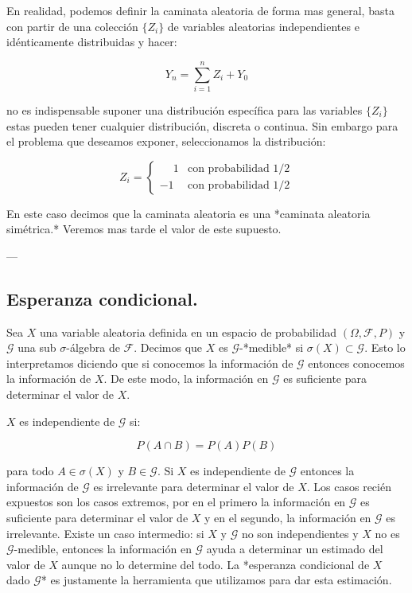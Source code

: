\documentclass{extreport}
\theoremstyle{definicion}
\theoremstyle{propiedad}
\begin{document}
En realidad, podemos definir la caminata aleatoria de forma mas general, basta con partir de una colección $\{Z_i\}$ de variables aleatorias independientes e idénticamente distribuidas  y hacer:

$$
Y_n = \sum_{i=1}^n Z_i + Y_0
$$

no es indispensable suponer una distribución específica para las variables $\{Z_i\}$ estas pueden tener cualquier distribución, discreta o continua. Sin embargo para el problema que deseamos exponer, seleccionamos la distribución:

$$
Z_i = \begin{cases} \phantom{-}1 & \text{con probabilidad }1/2  \\ 
-1 & \text{con probabilidad }1/2\end{cases}
$$

En este caso decimos que la caminata aleatoria es una *caminata aleatoria simétrica.* Veremos mas tarde el valor de este supuesto.

—

\subsection{Esperanza condicional.}

Sea $X$ una variable aleatoria definida en un espacio de probabilidad $(\Omega, \mathcal{F}, P)$ y  $\mathcal{G}$  una sub $\sigma$-álgebra de $\mathcal{F}$.  Decimos que $X$ es $\mathcal{G}$-*medible* si $\sigma(X)\subset \mathcal{G}$. Esto lo interpretamos diciendo que si conocemos la información de $\mathcal{G}$ entonces conocemos la información de $X$. De este modo, la información en $\mathcal{G}$ es suficiente para determinar el valor de $X$. 

$X$ es independiente de $\mathcal{G}$ si:

$$
P(A\cap B) = P(A)P(B)
$$

para todo $A\in \sigma(X)$ y $B\in\mathcal{G}$. Si $X$ es independiente de $\mathcal{G}$ entonces la información de $\mathcal{G}$ es irrelevante para determinar el valor de $X.$ Los casos recién expuestos son los casos extremos, por en el primero la información en $\mathcal{G}$ es suficiente para determinar el valor de $X$ y en el segundo, la información en $\mathcal{G}$ es irrelevante. Existe un caso intermedio: si $X$ y $\mathcal{G}$ no son independientes y  $X$ no es $\mathcal{G}$-medible, entonces la información en $\mathcal{G}$ ayuda a determinar un estimado del valor de $X$ aunque no lo determine del todo. La *esperanza condicional de $X$  dado $\mathcal{G}$* es justamente la herramienta que utilizamos para dar esta estimación.
\end{document}
